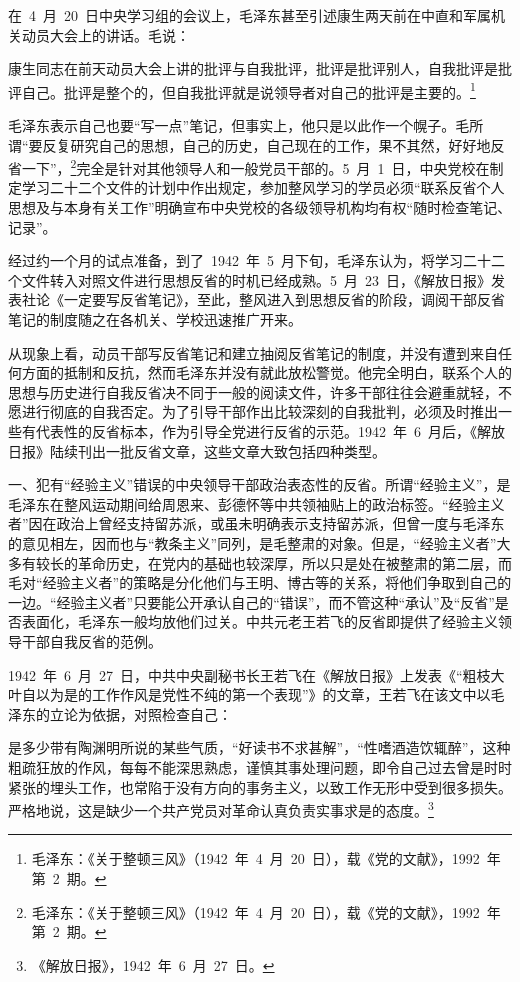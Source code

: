 在~4~月~20~日中央学习组的会议上，毛泽东甚至引述康生两天前在中直和军属机关动员大会上的讲话。毛说：

\begin{quoting}
康生同志在前天动员大会上讲的批评与自我批评，批评是批评别人，自我批评是批评自己。批评是整个的，但自我批评就是说领导者对自己的批评是主要的。\footnote{毛泽东：《关于整顿三风》（1942~年~4~月~20~日），载《党的文献》，1992~年第~2~期。}
\end{quoting}毛泽东表示自己也要“写一点”笔记，但事实上，他只是以此作一个幌子。毛所谓“要反复研究自己的思想，自己的历史，自己现在的工作，果不其然，好好地反省一下”，\footnote{毛泽东：《关于整顿三风》（1942~年~4~月~20~日），载《党的文献》，1992~年第~2~期。}完全是针对其他领导人和一般党员干部的。5~月~1~日，中央党校在制定学习二十二个文件的计划中作出规定，参加整风学习的学员必须“联系反省个人思想及与本身有关工作”明确宣布中央党校的各级领导机构均有权“随时检查笔记、记录”。

经过约一个月的试点准备，到了~1942~年~5~月下旬，毛泽东认为，将学习二十二个文件转入对照文件进行思想反省的时机已经成熟。5~月~23~日，《解放日报》发表社论《一定要写反省笔记》，至此，整风进入到思想反省的阶段，调阅干部反省笔记的制度随之在各机关、学校迅速推广开来。

从现象上看，动员干部写反省笔记和建立抽阅反省笔记的制度，并没有遭到来自任何方面的抵制和反抗，然而毛泽东并没有就此放松警觉。他完全明白，联系个人的思想与历史进行自我反省决不同于一般的阅读文件，许多干部往往会避重就轻，不愿进行彻底的自我否定。为了引导干部作出比较深刻的自我批判，必须及时推出一些有代表性的反省标本，作为引导全党进行反省的示范。1942~年~6~月后，《解放日报》陆续刊出一批反省文章，这些文章大致包括四种类型。

一、犯有“经验主义”错误的中央领导干部政治表态性的反省。所谓“经验主义”，是毛泽东在整风运动期间给周恩来、彭德怀等中共领袖贴上的政治标签。“经验主义者”因在政治上曾经支持留苏派，或虽未明确表示支持留苏派，但曾一度与毛泽东的意见相左，因而也与“教条主义”同列，是毛整肃的对象。但是，“经验主义者”大多有较长的革命历史，在党内的基础也较深厚，所以只是处在被整肃的第二层，而毛对“经验主义者”的策略是分化他们与王明、博古等的关系，将他们争取到自己的一边。“经验主义者”只要能公开承认自己的“错误”，而不管这种“承认”及“反省”是否表面化，毛泽东一般均放他们过关。中共元老王若飞的反省即提供了经验主义领导干部自我反省的范例。

1942~年~6~月~27~日，中共中央副秘书长王若飞在《解放日报》上发表《“粗枝大叶自以为是的工作作风是党性不纯的第一个表现”》的文章，王若飞在该文中以毛泽东的立论为依据，对照检查自己：

\begin{quoting}
是多少带有陶渊明所说的某些气质，“好读书不求甚解”，“性嗜酒造饮辄醉”，这种粗疏狂放的作风，每每不能深思熟虑，谨慎其事处理问题，即令自己过去曾是时时紧张的埋头工作，也常陷于没有方向的事务主义，以致工作无形中受到很多损失。严格地说，这是缺少一个共产党员对革命认真负责实事求是的态度。\footnote{《解放日报》，1942~年~6~月~27~日。}
\end{quoting}

